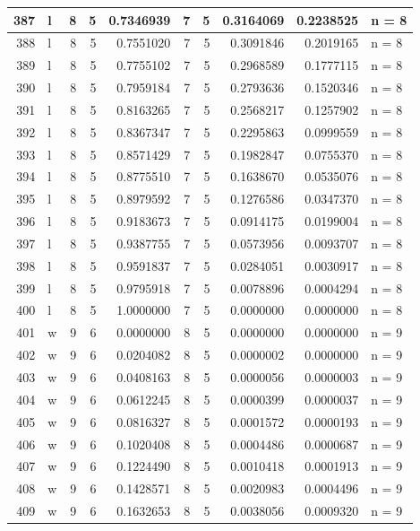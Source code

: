 \documentclass[
  letterpaper,
  DIV=11,
  numbers=noendperiod]{scrreprt}
\begin{document}
\begin{table}
\begin{tabular}[t]{r|l|r|r|r|r|r|r|r|l}
\hline
387 & l & 8 & 5 & 0.7346939 & 7 & 5 & 0.3164069 & 0.2238525 & n = 8\\
\hline
388 & l & 8 & 5 & 0.7551020 & 7 & 5 & 0.3091846 & 0.2019165 & n = 8\\
\hline
389 & l & 8 & 5 & 0.7755102 & 7 & 5 & 0.2968589 & 0.1777115 & n = 8\\
\hline
390 & l & 8 & 5 & 0.7959184 & 7 & 5 & 0.2793636 & 0.1520346 & n = 8\\
\hline
391 & l & 8 & 5 & 0.8163265 & 7 & 5 & 0.2568217 & 0.1257902 & n = 8\\
\hline
392 & l & 8 & 5 & 0.8367347 & 7 & 5 & 0.2295863 & 0.0999559 & n = 8\\
\hline
393 & l & 8 & 5 & 0.8571429 & 7 & 5 & 0.1982847 & 0.0755370 & n = 8\\
\hline
394 & l & 8 & 5 & 0.8775510 & 7 & 5 & 0.1638670 & 0.0535076 & n = 8\\
\hline
395 & l & 8 & 5 & 0.8979592 & 7 & 5 & 0.1276586 & 0.0347370 & n = 8\\
\hline
396 & l & 8 & 5 & 0.9183673 & 7 & 5 & 0.0914175 & 0.0199004 & n = 8\\
\hline
397 & l & 8 & 5 & 0.9387755 & 7 & 5 & 0.0573956 & 0.0093707 & n = 8\\
\hline
398 & l & 8 & 5 & 0.9591837 & 7 & 5 & 0.0284051 & 0.0030917 & n = 8\\
\hline
399 & l & 8 & 5 & 0.9795918 & 7 & 5 & 0.0078896 & 0.0004294 & n = 8\\
\hline
400 & l & 8 & 5 & 1.0000000 & 7 & 5 & 0.0000000 & 0.0000000 & n = 8\\
\hline
401 & w & 9 & 6 & 0.0000000 & 8 & 5 & 0.0000000 & 0.0000000 & n = 9\\
\hline
402 & w & 9 & 6 & 0.0204082 & 8 & 5 & 0.0000002 & 0.0000000 & n = 9\\
\hline
403 & w & 9 & 6 & 0.0408163 & 8 & 5 & 0.0000056 & 0.0000003 & n = 9\\
\hline
404 & w & 9 & 6 & 0.0612245 & 8 & 5 & 0.0000399 & 0.0000037 & n = 9\\
\hline
405 & w & 9 & 6 & 0.0816327 & 8 & 5 & 0.0001572 & 0.0000193 & n = 9\\
\hline
406 & w & 9 & 6 & 0.1020408 & 8 & 5 & 0.0004486 & 0.0000687 & n = 9\\
\hline
407 & w & 9 & 6 & 0.1224490 & 8 & 5 & 0.0010418 & 0.0001913 & n = 9\\
\hline
408 & w & 9 & 6 & 0.1428571 & 8 & 5 & 0.0020983 & 0.0004496 & n = 9\\
\hline
409 & w & 9 & 6 & 0.1632653 & 8 & 5 & 0.0038056 & 0.0009320 & n = 9\\

\end{tabular}
\end{table}
\end{document}
